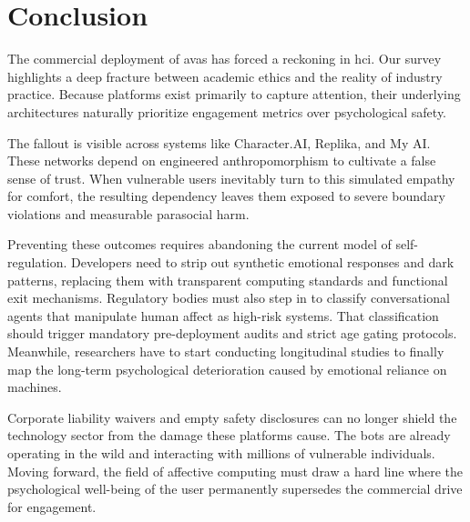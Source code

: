 \section{Conclusion}
\label{sec:conclusion}


The commercial deployment of \gls{avas} has forced a reckoning in \gls{hci}. Our survey highlights a deep fracture between academic ethics and the reality of industry practice. Because platforms exist primarily to capture attention, their underlying architectures naturally prioritize engagement metrics over psychological safety.

The fallout is visible across systems like Character.AI, Replika, and My AI. These networks depend on engineered anthropomorphism to cultivate a false sense of trust. When vulnerable users inevitably turn to this simulated empathy for comfort, the resulting dependency leaves them exposed to severe boundary violations and measurable parasocial harm.

Preventing these outcomes requires abandoning the current model of self-regulation. Developers need to strip out synthetic emotional responses and dark patterns, replacing them with transparent computing standards and functional exit mechanisms. Regulatory bodies must also step in to classify conversational agents that manipulate human affect as high-risk systems. That classification should trigger mandatory pre-deployment audits and strict age gating protocols. Meanwhile, researchers have to start conducting longitudinal studies to finally map the long-term psychological deterioration caused by emotional reliance on machines.

Corporate liability waivers and empty safety disclosures can no longer shield the technology sector from the damage these platforms cause. The bots are already operating in the wild and interacting with millions of vulnerable individuals. Moving forward, the field of affective computing must draw a hard line where the psychological well-being of the user permanently supersedes the commercial drive for engagement.

